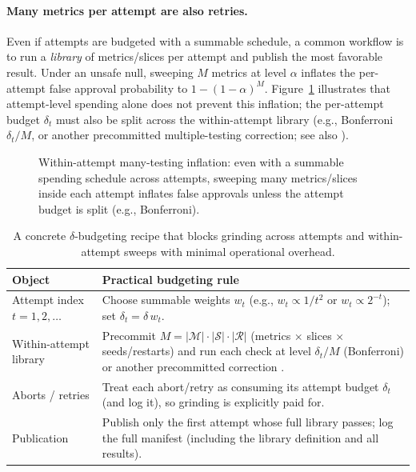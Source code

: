 \documentclass[11pt]{article}
\begin{document}
\paragraph{Many metrics per attempt are also retries.}
Even if attempts are budgeted with a summable schedule, a common workflow is to run a \emph{library} of metrics/slices per attempt and publish the most favorable result.
Under an unsafe null, sweeping $M$ metrics at level $\alpha$ inflates the per-attempt false approval probability to $1-(1-\alpha)^M$.
Figure~\ref{fig:within_attempt_library} illustrates that attempt-level spending alone does not prevent this inflation; the per-attempt budget $\delta_t$ must also be split across the within-attempt library
(e.g., Bonferroni $\delta_t/M$, or another precommitted multiple-testing correction; see also \cite{series:manytestinglowerbounds}).

\begin{figure}[t]
\centering
{}
\caption{Within-attempt many-testing inflation: even with a summable spending schedule across attempts, sweeping many metrics/slices inside each attempt inflates false approvals unless the attempt budget is split (e.g., Bonferroni).}
\label{fig:within_attempt_library}
\end{figure}




\begin{table}[t]
\centering
\begin{tabularx}{\linewidth}{@{}lX@{}}
\toprule
Object & Practical budgeting rule \\
\midrule
Attempt index $t=1,2,\dots$ & Choose summable weights $w_t$ (e.g., $w_t \propto 1/t^2$ or $w_t \propto 2^{-t}$); set $\delta_t=\delta\, w_t$.\\
Within-attempt library & Precommit $M = |\mathcal{M}|\cdot|\mathcal{S}|\cdot|\mathcal{R}|$ (metrics $\times$ slices $\times$ seeds/restarts) and run each check at level $\delta_t/M$ (Bonferroni) or another precommitted correction \cite{series:manytestinglowerbounds}.\\
Aborts / retries & Treat each abort/retry as consuming its attempt budget $\delta_t$ (and log it), so grinding is explicitly paid for.\\
Publication & Publish only the first attempt whose full library passes; log the full manifest (including the library definition and all results).\\
\bottomrule
\end{tabularx}
\caption{A concrete $\delta$-budgeting recipe that blocks grinding across attempts and within-attempt sweeps with minimal operational overhead.}
\label{tab:budget_recipe}
\end{table}
\end{document}
